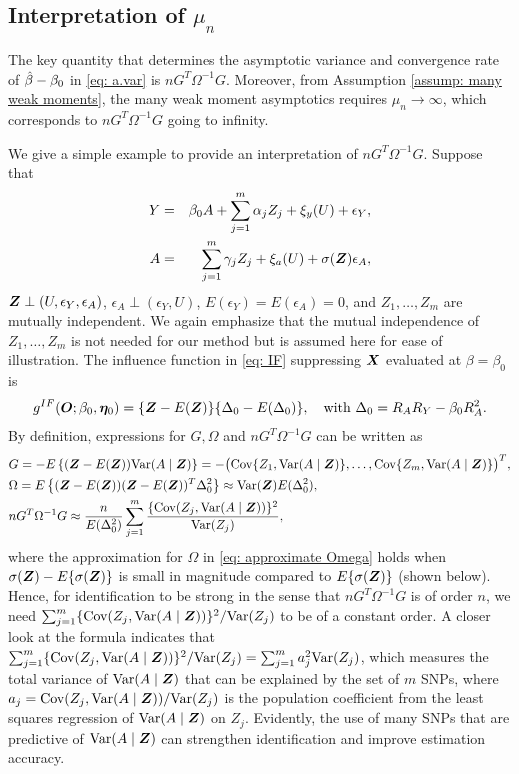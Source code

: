 \documentclass[12pt]{article}
\begin{document}
{ \subsection{Interpretation of $\mu_n$}
 
 
 The key quantity that determines the asymptotic variance and convergence rate of $ \hat{{ \beta}}- { \beta}_0 $ in \eqref{eq: a.var} is $  n G^T \Omega^{-1} G $. Moreover, from Assumption \ref{assump: many weak moments}, the many weak moment asymptotics requires $ \mu_n\rightarrow \infty $, which corresponds to $ n G^T \Omega^{-1} G $ going to infinity. 
 
 We give a simple example to provide an interpretation of $ n G^T \Omega^{-1} G $. Suppose that 
 \begin{eqnarray}
 	Y&=&\beta_0A+\sum_{j=1}^{m} \alpha_j Z_j +\xi_y(U)+\epsilon_Y, \nonumber\\
 	A&=&\sum_{j=1}^{m} \gamma_j Z_j +\xi_a(U)+\sigma(\bm{Z}) \epsilon_A, \nonumber
 \end{eqnarray}
 $\bm{Z}\perp ( U, \epsilon_Y, \epsilon_A)$,  $ \epsilon_A\perp (\epsilon_Y, U) $,   $E(\epsilon_Y)= E(\epsilon_A)= 0$,  and  $Z_1, \dots, Z_m$ are mutually independent. We again emphasize that the mutual independence of $ Z_1,\dots, Z_m $ is not needed  for our method but is assumed here for ease of illustration. The influence function in \eqref{eq: IF} suppressing $\bm{X}$ evaluated at $\beta=\beta_0$ is 
 \begin{align*}
 	g^{IF} (\bm O; \beta_0, \bm \eta_0) =  \{ \bm{Z}- E(\bm{Z})\} \{\Delta_0- E(\Delta_0)\}, \quad \text{with } \Delta_0= R_AR_{Y}-\beta_0 R_A^2. 
 \end{align*}
 By definition, expressions for $ G, \Omega$ and $ nG^T \Omega^{-1} G $ can be written as 
 \begin{align}
 	&G=-E\left\{ (\bm{Z}- E(\bm{Z}))\mbox{Var} (A\mid\bm{Z})\right\}= -\big(\mbox{Cov}\{Z_1, \mbox{Var}(A\mid\bm{Z})\}, \dots, \mbox{Cov}\{Z_m,\mbox{Var}(A\mid\bm{Z})\}\big)^T,\nonumber\\
 	&\Omega= E\left\{ (\bm{Z}-E(\bm{Z})) (\bm{Z}-E(\bm{Z}))^T \Delta_0^2\right\}\approx \mbox{Var} (\bm{Z}) E( \Delta_0^2),    \label{eq: approximate Omega}\\
 	&nG^{T} \Omega^{-1} G \approx \frac{n}{E( \Delta_0^2) } \sum_{j=1}^{m} \frac{\{\mbox{Cov} (Z_j, \mbox{Var}(A\mid\bm{Z}))\}^2}{\mbox{Var}(Z_j)}, \nonumber
 \end{align}
 where the approximation for $\Omega$ in \eqref{eq: approximate Omega} holds when $\sigma(\bm{Z}) - E\{\sigma(\bm{Z})\} $ is small in magnitude compared to $E\{\sigma(\bm{Z})\}$ (shown below). 
 Hence, for identification to be strong in the sense that $ nG^{T} \Omega^{-1} G $ is of order $ n $,  we need $ \sum_{j=1}^{m} \{\mbox{Cov} (Z_j, \mbox{Var}(A\mid\bm{Z}))\}^2/\mbox{Var}(Z_j)$ to be of a constant order. A closer look at the formula indicates that $\sum_{j=1}^{m}\{ \mbox{Cov} (Z_j, \mbox{Var}(A\mid\bm{Z}))\}^2/\mbox{Var}(Z_j)= \sum_{j=1}^{m} a_j^2 \mbox{Var}(Z_j)$, which  measures the total variance of $ \mbox{Var}(A\mid\bm{Z}) $ that can be explained by the set of $ m $ SNPs, where $ a_j = \mbox{Cov}(Z_j, \mbox{Var}(A\mid\bm{Z}))/\mbox{Var}(Z_j)$ is the population coefficient from the least squares regression of $ \mbox{Var}(A\mid\bm{Z}) $ on $ Z_j $. Evidently, the use of many SNPs that are predictive of $ \mbox{Var}(A\mid\bm{Z}) $ can strengthen identification and improve estimation accuracy. 
 

}
\end{document}
